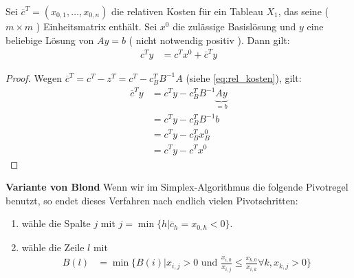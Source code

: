 \begin{lemma}
Sei $\overline{c}^T = ( x_{0,1}, \dotsc , x_{0,n} )$ die relativen Kosten für ein Tableau $X_1$, das seine ($m \times m$ ) Einheitsmatrix enthält. Sei $x^0$ die zulässige Basislösung und $y$ eine beliebige Lösung von $Ay=b$ ( nicht notwendig positiv ). Dann gilt:
\begin{align*}
c^Ty &= c^Tx^0 + \overline{c}^Ty
\end{align*}
\end{lemma}
\begin{proof}
Wegen $\overline{c}^T = c^T - z^T = c^T - c^T_B B^{-1}A$ (siehe \eqref{eq:rel_kosten}), gilt:
\begin{align*}
\overline{c}^Ty &= c^Ty - c^T_B B^{-1}\underbrace{Ay}_{=b} \\
 &= c^Ty - c^T_B B^{-1}b \\
 &= c^Ty - c^T_B x_B^0 \\
 &= c^Ty - c^T x^0
\end{align*}
\end{proof}
\begin{theorem}\textbf{Variante von Blond}
Wenn wir im Simplex-Algorithmus die folgende Pivotregel benutzt, so endet dieses Verfahren nach endlich vielen Pivotschritten:
\begin{enumerate}
\item \label{blond_1}wähle die Spalte $j$ mit $j = \min\{h | \overline{c}_h = x_{0,h} < 0 \}$.
\item \label{blond_2}wähle die Zeile $l$ mit
\begin{align*}
B(l) &= \min \bigg \{ B(i) \bigg | x_{i,j} > 0 \text{ und } \frac{x_{i,0}}{x_{i,j}} \leq \frac{x_{k,0}}{x_{i,k}} \forall k, x_{k,j} > 0 \bigg \}
\end{align*}
\end{enumerate}
\end{theorem}
